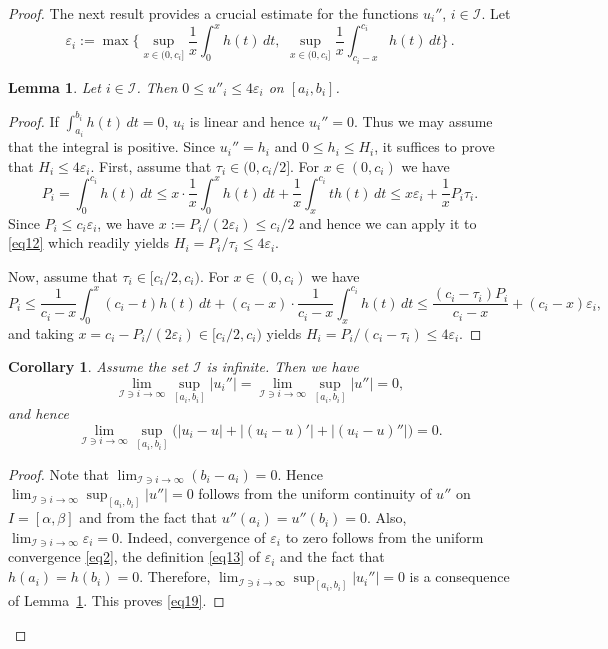 \documentclass[intlimits,12pt,reqno]{amsart}
\newcommand{\eps}{\varepsilon}
\newtheorem{lemma}[theorem]{Lemma}
\newtheorem{corollary}[theorem]{Corollary}
\theoremstyle{definition}
\begin{document}
\begin{proof}
The next result provides a crucial estimate for the functions $u_i''$, $i\in \mathcal{I}$. Let
\begin{equation}
\label{eq13}
\eps_i:=
\max\Big\{\sup_{x\in (0,c_i]}\frac{1}{x}\int_0^x h(t)\, dt,\,\, \sup_{x\in (0,c_i]}\frac{1}{x}\int_{c_i-x}^{c_i} h(t)\, dt \Big\}\, .
\end{equation}

\begin{lemma}
\label{T5}
Let $i\in\mathcal{I}$. Then $0\leq u''_i\leq 4\eps_i$ on $[a_i,b_i]$.
\end{lemma}
\begin{proof}
If $\int_{a_i}^{b_i} h(t)\, dt=0$, $u_i$ is linear and hence $u_i''=0$. Thus we may assume that the integral is positive. Since $u_i''=h_i$ and $0\leq h_i\leq H_i$, it suffices to prove that $H_i\leq 4\eps_i$.
First, assume that $\tau_i\in (0,c_i/2]$. For $x\in (0,c_i)$ we have
\begin{equation}
\label{eq12}
P_i=\int_0^{c_i} h(t)\, dt\leq
x\cdot\frac{1}{x}\int_0^x h(t)\, dt + \frac{1}{x}\int_x^{c_i} th(t)\, dt\leq
x\eps_i+\frac{1}{x}P_i\tau_i.
\end{equation}
Since $P_i\leq c_i\eps_i$, we have $x:=P_i/(2\eps_i)\leq c_i/2$ and hence we can apply it to \eqref{eq12} which readily yields $H_i=P_i/\tau_i\leq 4\eps_i$.

Now, assume that $\tau_i\in [c_i/2,c_i)$. For $x\in (0,c_i)$ we have
$$
P_i\leq\frac{1}{c_i-x}\int_0^x(c_i-t) h(t)\, dt+(c_i-x)\cdot\frac{1}{c_i-x}\int_x^{c_i} h(t)\, dt\leq
\frac{(c_i-\tau_i)P_i}{c_i-x} +(c_i-x)\eps_i,
$$
and taking $x=c_i-P_i/(2\eps_i)\in [c_i/2,c_i)$ yields $H_i=P_i/(c_i-\tau_i)\leq 4\eps_i$.
\end{proof}

\begin{corollary}
\label{T6}
Assume the set $\mathcal{I}$ is infinite. Then we have
\begin{equation}
\label{eq19}
\lim_{\mathcal{I}\ni i\to\infty} \sup_{[a_i,b_i]} |u_i''|=\lim_{\mathcal{I}\ni i\to\infty} \sup_{[a_i,b_i]} |u''|=0,
\end{equation}
and hence
\begin{equation}
\label{eq18}
\lim_{\mathcal{I}\ni i\to\infty} \sup_{[a_i,b_i]}\big(|u_i-u|+|(u_i-u)'|+|(u_i-u)''|\big)=0.
\end{equation}
\end{corollary}
\begin{proof}
Note that $\lim_{\mathcal{I}\ni i\to\infty} (b_i-a_i)=0$. Hence
$\lim_{\mathcal{I}\ni i\to\infty} \sup_{[a_i,b_i]} |u''|=0$ follows from the uniform continuity of $u''$ on $I=[\alpha,\beta]$ and from the fact that $u''(a_i)=u''(b_i)=0$.
Also, $\lim_{\mathcal{I}\ni i\to\infty} \eps_i=0$. Indeed, convergence of $\eps_i$ to zero follows from the uniform convergence \eqref{eq2}, the definition \eqref{eq13} of $\eps_i$ and the fact that $h(a_i)=h(b_i)=0$. Therefore,
$\lim_{\mathcal{I}\ni i\to\infty} \sup_{[a_i,b_i]} |u_i''|=0$ is a consequence of Lemma~\ref{T5}. This proves \eqref{eq19}.


\end{proof}
\end{proof}
\end{document}
